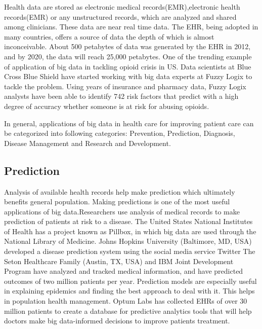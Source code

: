 \documentclass[sigconf]{acmart}
\begin{document}
Health data are stored as electronic medical records(EMR),electronic health records(EMR) or any unstructured records, which are analyzed and shared among clinicians. These data are near real time data. The EHR, being adopted in many countries, offers a source of data the depth of which is almost inconceivable. About 500 petabytes of data was generated by the EHR in 2012, and by 2020, the data will reach 25,000 petabytes\cite{www-ghdonline-org}. One of the trending example of application of big data in tackling opioid crisis in US.
Data scientists at Blue Cross Blue Shield have started working with big data experts at Fuzzy Logix to tackle the problem. Using years of insurance and pharmacy data, Fuzzy Logix analysts have been able to identify 742 risk factors that predict with a high degree of accuracy whether someone is at risk for abusing opioids\cite{www-datapine-com}.

In general, applications of big data in health care for improving patient care can be categorized into following categories: Prevention, Prediction, Diagnosis, Disease Management and Research and Development.

\subsection{Prediction}

Analysis of available health records help make prediction which ultimately benefits general population. Making predictions is one of the most useful applications of big data.Researchers use analysis of medical records to make prediction of patients at risk to a disease. The United States National Institutes of Health has a project known as Pillbox, in which big data are used through the National Library of Medicine\cite{www-tandf-com}. Johns Hopkins University (Baltimore, MD, USA) developed a disease prediction system using the social media service Twitter\cite{www-ncbi-nlm-nih-gov}
The Seton Healthcare Family (Austin, TX, USA) and IBM Joint Development Program have analyzed and tracked medical information, and have predicted outcomes of two million patients per
year\cite{www-uhcjsc-com}. Prediction models are especially useful in explaining epidemics and finding the best approach to deal with it. This helps in population health management. Optum Labs has collected EHRs of over 30 million patients to create a database for predictive analytics tools that will help doctors make big 
data-informed decisions to improve patients treatment\cite{www-mapr-com}.
\end{document}
